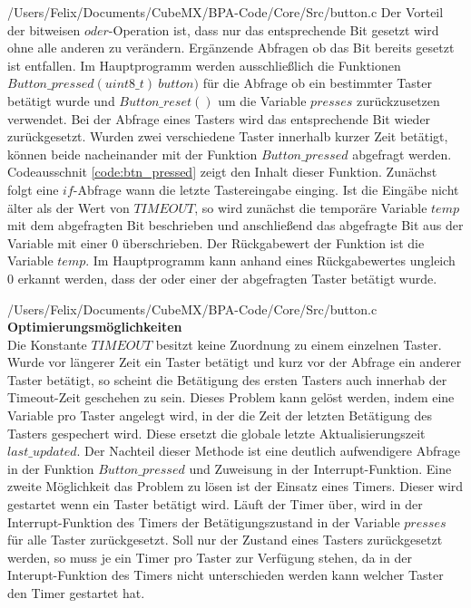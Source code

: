 
{/Users/Felix/Documents/CubeMX/BPA-Code/Core/Src/button.c}
Der Vorteil der bitweisen $oder$-Operation ist, dass nur das entsprechende Bit gesetzt wird ohne alle anderen zu verändern. Ergänzende Abfragen ob das Bit bereits gesetzt ist entfallen.
Im Hauptprogramm werden ausschließlich die Funktionen $Button\_pressed(uint8\_t)\ button)$ für die Abfrage ob ein bestimmter Taster betätigt wurde und $Button\_reset()$ um die Variable $presses$ zurückzusetzen verwendet. Bei der Abfrage eines Tasters wird das entsprechende Bit wieder zurückgesetzt. Wurden zwei verschiedene Taster innerhalb kurzer Zeit betätigt, können beide nacheinander mit der Funktion $Button\_pressed$ abgefragt werden. Codeausschnit \ref{code:btn_pressed} zeigt den Inhalt dieser Funktion. Zunächst folgt eine $if$-Abfrage wann die letzte Tastereingabe einging. Ist die Eingäbe nicht älter als der Wert von $TIMEOUT$, so wird zunächst die temporäre Variable $temp$ mit dem abgefragten Bit beschrieben und anschließend das abgefragte Bit aus der Variable mit einer $0$ überschrieben. Der Rückgabewert der Funktion ist die Variable $temp$. Im Hauptprogramm kann anhand eines Rückgabewertes ungleich $0$ erkannt werden, dass der oder einer der abgefragten Taster betätigt wurde.

{/Users/Felix/Documents/CubeMX/BPA-Code/Core/Src/button.c}
\textbf{Optimierungsmöglichkeiten}\\
Die Konstante $TIMEOUT$ besitzt keine Zuordnung zu einem einzelnen Taster. Wurde vor längerer Zeit ein Taster betätigt und kurz vor der Abfrage ein anderer Taster betätigt, so scheint die Betätigung des ersten Tasters auch innerhab der Timeout-Zeit geschehen zu sein. Dieses Problem kann gelöst werden, indem eine Variable pro Taster angelegt wird, in der die Zeit der letzten Betätigung des Tasters gespechert wird. Diese ersetzt die globale letzte Aktualisierungszeit $last\_updated$. Der Nachteil dieser Methode ist eine deutlich aufwendigere Abfrage in der Funktion $Button\_pressed$ und Zuweisung in der Interrupt-Funktion. Eine zweite Möglichkeit das Problem zu lösen ist der Einsatz eines Timers. Dieser wird gestartet wenn ein Taster betätigt wird. Läuft der Timer über, wird in der Interrupt-Funktion des Timers der Betätigungszustand in der Variable $presses$ für alle Taster zurückgesetzt. Soll nur der Zustand eines Tasters zurückgesetzt werden, so muss je ein Timer pro Taster zur Verfügung stehen, da in der Interupt-Funktion des Timers nicht unterschieden werden kann welcher Taster den Timer gestartet hat.